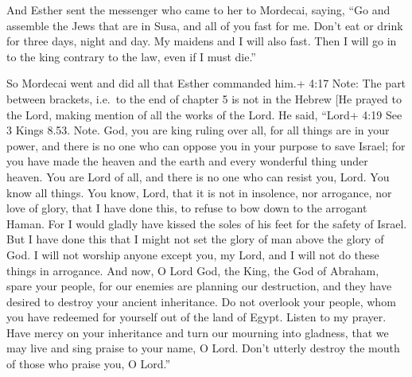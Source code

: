  And Esther sent the messenger who came to her to Mordecai,
saying,  ``Go and assemble the Jews that are in Susa, and
all of you fast for me. Don't eat or drink for three days, night and
day. My maidens and I will also fast. Then I will go in to the king
contrary to the law, even if I must die.''

 So Mordecai went and did all that Esther commanded him.+
4:17 Note: The part between brackets, i.e.~to the end of chapter 5 is
not in the Hebrew  {[}He prayed to the Lord, making mention
of all the works of the Lord.  He said, ``Lord+ 4:19 See 3
Kings 8.53. Note. God, you are king ruling over all, for all things are
in your power, and there is no one who can oppose you in your purpose to
save Israel;  for you have made the heaven and the earth
and every wonderful thing under heaven.  You are Lord of
all, and there is no one who can resist you, Lord.  You
know all things. You know, Lord, that it is not in insolence, nor
arrogance, nor love of glory, that I have done this, to refuse to bow
down to the arrogant Haman.  For I would gladly have kissed
the soles of his feet for the safety of Israel.  But I have
done this that I might not set the glory of man above the glory of God.
I will not worship anyone except you, my Lord, and I will not do these
things in arrogance.  And now, O Lord God, the King, the
God of Abraham, spare your people, for our enemies are planning our
destruction, and they have desired to destroy your ancient inheritance.
 Do not overlook your people, whom you have redeemed for
yourself out of the land of Egypt.  Listen to my prayer.
Have mercy on your inheritance and turn our mourning into gladness, that
we may live and sing praise to your name, O Lord. Don't utterly destroy
the mouth of those who praise you, O Lord.''


